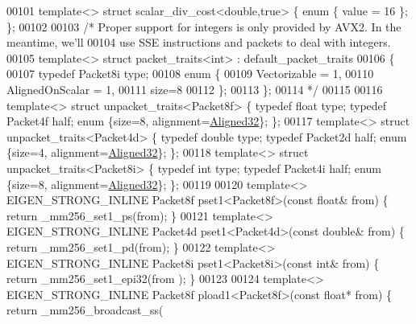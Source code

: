\begin{DoxyCode}
00101 \textcolor{keyword}{template}<> \textcolor{keyword}{struct }scalar\_div\_cost<double,true> \{ \textcolor{keyword}{enum} \{ value = 16 \}; \};
00102 
00103 \textcolor{comment}{/* Proper support for integers is only provided by AVX2. In the meantime, we'll}
00104 \textcolor{comment}{   use SSE instructions and packets to deal with integers.}
00105 \textcolor{comment}{template<> struct packet\_traits<int>    : default\_packet\_traits}
00106 \textcolor{comment}{\{}
00107 \textcolor{comment}{  typedef Packet8i type;}
00108 \textcolor{comment}{  enum \{}
00109 \textcolor{comment}{    Vectorizable = 1,}
00110 \textcolor{comment}{    AlignedOnScalar = 1,}
00111 \textcolor{comment}{    size=8}
00112 \textcolor{comment}{  \};}
00113 \textcolor{comment}{\};}
00114 \textcolor{comment}{*/}
00115 
00116 \textcolor{keyword}{template}<> \textcolor{keyword}{struct }unpacket\_traits<Packet8f> \{ \textcolor{keyword}{typedef} \textcolor{keywordtype}{float}  type; \textcolor{keyword}{typedef} Packet4f half; \textcolor{keyword}{enum} \{size=8, 
      alignment=\hyperlink{group__enums_gga45fe06e29902b7a2773de05ba27b47a1a7797d247b86f6e9837cc338beb6060de}{Aligned32}\}; \};
00117 \textcolor{keyword}{template}<> \textcolor{keyword}{struct }unpacket\_traits<Packet4d> \{ \textcolor{keyword}{typedef} \textcolor{keywordtype}{double} type; \textcolor{keyword}{typedef} Packet2d half; \textcolor{keyword}{enum} \{size=4, 
      alignment=\hyperlink{group__enums_gga45fe06e29902b7a2773de05ba27b47a1a7797d247b86f6e9837cc338beb6060de}{Aligned32}\}; \};
00118 \textcolor{keyword}{template}<> \textcolor{keyword}{struct }unpacket\_traits<Packet8i> \{ \textcolor{keyword}{typedef} \textcolor{keywordtype}{int}    type; \textcolor{keyword}{typedef} Packet4i half; \textcolor{keyword}{enum} \{size=8, 
      alignment=\hyperlink{group__enums_gga45fe06e29902b7a2773de05ba27b47a1a7797d247b86f6e9837cc338beb6060de}{Aligned32}\}; \};
00119 
00120 \textcolor{keyword}{template}<> EIGEN\_STRONG\_INLINE Packet8f pset1<Packet8f>(\textcolor{keyword}{const} \textcolor{keywordtype}{float}&  from) \{ \textcolor{keywordflow}{return} \_mm256\_set1\_ps(from); 
      \}
00121 \textcolor{keyword}{template}<> EIGEN\_STRONG\_INLINE Packet4d pset1<Packet4d>(\textcolor{keyword}{const} \textcolor{keywordtype}{double}& from) \{ \textcolor{keywordflow}{return} \_mm256\_set1\_pd(from); 
      \}
00122 \textcolor{keyword}{template}<> EIGEN\_STRONG\_INLINE Packet8i pset1<Packet8i>(\textcolor{keyword}{const} \textcolor{keywordtype}{int}&    from) \{ \textcolor{keywordflow}{return} \_mm256\_set1\_epi32(from
      ); \}
00123 
00124 \textcolor{keyword}{template}<> EIGEN\_STRONG\_INLINE Packet8f pload1<Packet8f>(\textcolor{keyword}{const} \textcolor{keywordtype}{float}*  from) \{ \textcolor{keywordflow}{return} \_mm256\_broadcast\_ss(

\end{DoxyCode}
